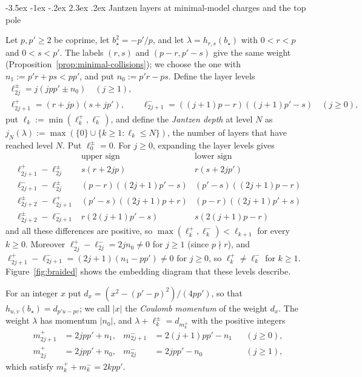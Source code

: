 \documentclass[twoside,10pt]{article}
\makeatletter
\numberwithin{equation}{section}
\theoremstyle{slbody}
\theoremstyle{definition}
\theoremstyle{remark}
\renewcommand{\section}{%
  \@startsection{section}{1}{\z@}%
    {-3.5ex \@plus -1ex \@minus -.2ex}%
    {2.3ex \@plus .2ex}%
    {\normalfont\large\bfseries}}
\makeatother
\begin{document}
\section{Jantzen layers at minimal-model charges and the top pole}\label{sec:mm-layers}

Let \(p,p'\geq2\) be
coprime, let \(b_\star^2=-p'/p\), and let \(\lambda=h_{r,s}(b_\star)\) with
\(0<r<p\) and \(0<s<p'\).  The labels \((r,s)\) and \((p-r,p'-s)\) give the
same weight (Proposition~\ref{prop:minimal-collisions}); we choose the one with
\(n_1:=p'r+ps<pp'\), and put \(n_0:=p'r-ps\).  Define the layer levels
\begin{gather*}
 \ell^\pm_{2j}=j(jpp'\pm n_0)\quad(j\geq1),\\
 \ell^+_{2j+1}=(r+jp)(s+jp'),\qquad
 \ell^-_{2j+1}=((j+1)p-r)((j+1)p'-s)\quad(j\geq0),
\end{gather*}
put \(\ell_k:=\min(\ell^+_k,\ell^-_k)\), and define the \emph{Jantzen depth}
at level \(N\) as
\(j_N(\lambda):=\max(\{0\}\cup\{k\geq1:\ell_k\leq N\})\), the number of layers
that have reached level \(N\).  Put \(\ell^\pm_0=0\).  For \(j\geq0\),
expanding the layer levels gives
\[
 \begin{array}{lll}
  & \text{upper sign} & \text{lower sign}\\[2pt]
  \ell^+_{2j+1}-\ell^\pm_{2j} & s(r+2jp) & r(s+2jp')\\
  \ell^-_{2j+1}-\ell^\pm_{2j} & (p-r)((2j+1)p'-s) & (p'-s)((2j+1)p-r)\\
  \ell^\pm_{2j+2}-\ell^+_{2j+1} & (p'-s)((2j+1)p+r) & (p-r)((2j+1)p'+s)\\
  \ell^\pm_{2j+2}-\ell^-_{2j+1} & r(2(j+1)p'-s) & s(2(j+1)p-r)
 \end{array}
\]
and all these differences are positive, so \(\max(\ell^+_k,\ell^-_k)<\ell_{k+1}\)
for every \(k\geq0\).  Moreover \(\ell^+_{2j}-\ell^-_{2j}=2jn_0\neq0\) for
\(j\geq1\) (since \(p\nmid r\)), and
\(\ell^+_{2j+1}-\ell^-_{2j+1}=(2j+1)(n_1-pp')\neq0\) for \(j\geq0\), so
\(\ell^+_k\neq\ell^-_k\) for \(k\geq1\).  Figure~\ref{fig:braided} shows the embedding
diagram that these levels describe.

For an integer \(x\) put \(d_x=(x^2-(p'-p)^2)/(4pp')\), so that
\(h_{u,v}(b_\star)=d_{p'u-pv}\); we call \(|x|\) the \emph{Coulomb momentum} of
the weight \(d_x\).  The weight \(\lambda\) has momentum \(|n_0|\), and
\(\lambda+\ell^\pm_k=d_{m^\pm_k}\) with the positive integers
\[
 \begin{aligned}
  m^+_{2j+1}&=2jpp'+n_1,& m^-_{2j+1}&=2(j+1)pp'-n_1&&(j\geq0),\\
  m^+_{2j}&=2jpp'+n_0,& m^-_{2j}&=2jpp'-n_0&&(j\geq1),
 \end{aligned}
\]
which satisfy \(m^+_k+m^-_k=2kpp'\).
\end{document}
